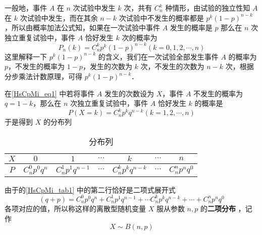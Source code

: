 一般地，事件 $A$ 在 $n$ 次试验中发生 $k$ 次，共有 $C_n^k$ 种情形，由试验的独立性知 $A$ 在 $k$ 次试验中发生，而在其余 $n-k$ 次试验中不发生的概率都是 $p^k(1-p)^{n-k}$，所以由概率加法公式知，如果在一次试验中事件 $A$ 发生的概率是 $p$ 那么在 $n$ 次独立重复试验中，事件 $A$ 恰好发生 $k$ 次的概率为
\begin{equation}\label{HsCpMi_eq1} 
P_n(k) = C_n^kp^k(1-p)^{n-k}(k=0,1,2,\cdots,n)
\end{equation}
这里解释一下 $p^k(1-p)^{n-k}$ 的含义，我们在一次试验全部发生事件 $A$ 的概率为 $p$，不发生的概率为 $1-p$，发生的次数为 $k$ 次，不发生的次数为 $n-k$ 次，根据分步乘法计数原理，可得 $p^k(1-p)^{n-k}$．

在\autoref{HsCpMi_eq1} 中若将事件 $A$ 发生的次数设为 $X$，事件 $A$ 不发生的概率为 $q = 1 - k$，那么在 $n$ 次独立重复试验中，事件 $A$ 恰好发生 $k$ 的概率是
\begin{equation}
P(X=k) = C_n^kp^kq^{n-k}(k = 1,2,\cdots,n)
\end{equation}
于是得到 $X$ 的分布列

\begin{table}[ht]
\centering
\caption{分布列}\label{HsCpMi_tab1} 
\begin{tabular}{|c|c|c|c|c|c|c|}
\hline
$X$ & $0$ & $1$ & $\cdots$ & $k$ & $\cdots$ & $n$ \\
\hline
$P$ & $C_n^0p^0q^n$ & $C_n^1p^1q^{n-1}$ & $\cdots$ & $C_n^kp^kq^{n-k}$ & $\cdots$ & $C_n^np^nq^0$ \\
\hline
\end{tabular}
\end{table}

由于的\autoref{HsCpMi_tab1} 中的第二行恰好是二项式展开式
\begin{equation}
(q+p) = C_n^0p^0q^n + C_n^1p^1q^{n-1}+\cdots C_n^kp^kq^{n-k}+\cdots + C_n^np^nq^0
\end{equation}
各项对应的值，所以称这样的离散型随机变量 $X$ 服从参数 $n,p$ 的\textbf{二项分布} ，记作
\begin{equation}
X\sim B(n,p)
\end{equation}